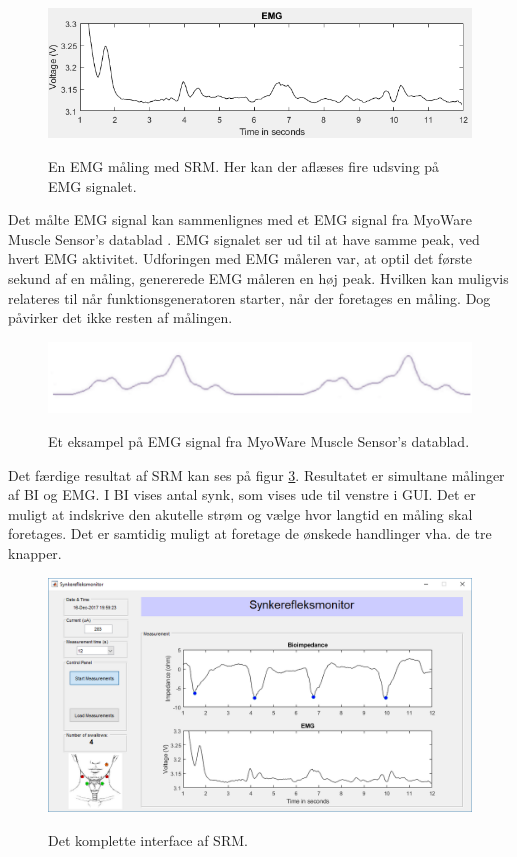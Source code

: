 \begin{figure}[H]
\centering
{\includegraphics[width=\linewidth]
{Figure/emgmaling}}
\caption{En EMG måling med SRM. Her kan der aflæses fire udsving på EMG signalet.}
\label{Fig:emgmaling}
\end{figure} 

Det målte EMG signal kan sammenlignes med et EMG signal fra MyoWare Muscle Sensor's datablad . EMG signalet ser ud til at have samme peak, ved hvert EMG aktivitet. Udforingen med EMG måleren var, at optil det første sekund af en måling, genererede EMG måleren en høj peak. Hvilken kan muligvis relateres til når funktionsgeneratoren starter, når der foretages en måling. Dog påvirker det ikke resten af målingen.


\begin{figure}[H]
\centering
{\includegraphics[width=\linewidth]
{Figure/emgsignal}}
\caption{Et eksampel på EMG signal fra MyoWare Muscle Sensor's datablad.}
\label{Fig:emgsignal}
\end{figure} 

Det færdige resultat af SRM kan ses på figur \ref{Fig:guiDone2}. Resultatet er simultane målinger af BI og EMG. I BI vises antal synk, som vises ude til venstre i GUI. Det er muligt at indskrive den akutelle strøm og vælge hvor langtid en måling skal foretages. Det er samtidig muligt at foretage de ønskede handlinger vha. de tre knapper. 

\begin{figure}[H]
\centering
{\includegraphics[width=\linewidth]
{Figure/guiDone}}
\caption{Det komplette interface af SRM.}
\label{Fig:guiDone2}
\end{figure} 



